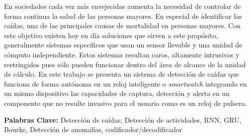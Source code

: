 En sociedades cada vez más envejecidas aumenta la necesidad de controlar de forma continua la salud de las personas mayores. En especial de identificar las caídas, una de las principales causas de mortalidad en personas mayores. Con este objetivo existen hoy en día soluciones que sirven a este propósito, generalmente sistemas específicos que usan un sensor llevable y una unidad de cómputo independiente. Estos sistemas resultan caros, altamente intrusivos y restringidos pues sólo pueden funcionar dentro del área de alcance de la unidad de cálculo. En este trabajo se presenta un sistema de detección de caídas que funciona de forma autónoma en un reloj inteligente o \textit{smartwatch} integrando en un mismo dispositivo las capacidades de captura, detección y alerta en un componente que no resulte invasivo para el usuario como es un reloj de pulsera.

{\bf Palabras Clave:} Detección de caídas, Detección de actividades, RNN, GRU, Bourke, Detección de anomalías, codificador/decodificador

